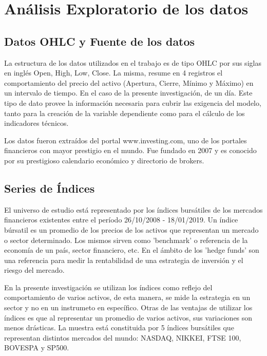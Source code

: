 \documentclass[a4paper,12pt]{Latex/Classes/PhDthesisPSnPDF}
\begin{document}
\section{Análisis Exploratorio de los datos}

\subsection{Datos OHLC y Fuente de los datos}

La estructura de los datos utilizados en el trabajo es de tipo OHLC por sus siglas en inglés Open, High, Low, Close. La misma, resume en 4 registros el comportamiento del precio del activo (Apertura, Cierre, Mínimo y Máximo) en un intervalo de tiempo. En el caso de la presente investigación, de un día. Este tipo de dato provee la información necesaria para cubrir las exigencia del modelo, tanto para la creación de la variable dependiente como para el cálculo de los indicadores técnicos. 

Los datos fueron extraídos del portal www.investing.com, uno de los portales financieros con mayor prestigio en el mundo. Fue fundado en 2007 y es conocido por su prestigioso calendario económico y directorio de brokers.

\subsection{Series de Índices}

El universo de estudio está representado por los índices bursátiles de los mercados financieros existentes entre el período 26/10/2008 - 18/01/2019. Un índice búrsatil es un promedio de los precios de los activos que representan un mercado o sector determinado. Los mismos sirven como 'benchmark' o referencia de la economía de un país, sector financiero, etc. En el ámbito de los 'hedge funds' son una referencia para medir la rentabilidad de una estrategia de inversión y el riesgo del mercado.

En la presente investigación se utilizan los índices como reflejo del comportamiento de varios activos, de esta manera, se mide la estrategia en un sector y no en un instrumeto en específico. Otras de las ventajas de utilizar los índices es que al representar un promedio de varios activos, sus variaciones son menos drásticas. La muestra está constituida por 5 índices bursátiles que representan distintos mercados del mundo: NASDAQ, NIKKEI, FTSE 100, BOVESPA y SP500.

\end{document}
